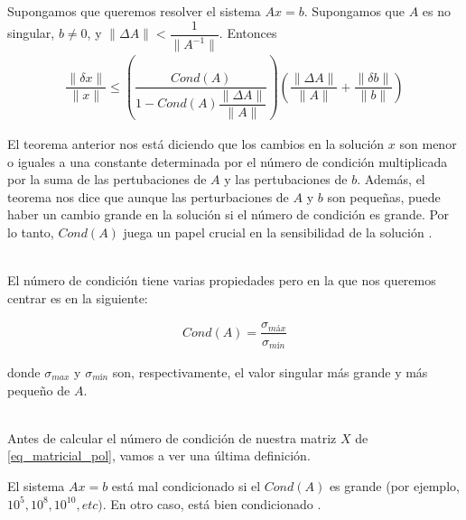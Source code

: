 \begin{theorem} \label{teo:perturbaciones}
Supongamos que queremos resolver el sistema $Ax = b$. Supongamos que $A$ es no singular, $b \neq 0$, y $\parallel \Delta A \parallel < \dfrac{1}{\parallel A^{-1} \parallel}$. Entonces
\begin{equation*}
    \begin{aligned}
    \dfrac{\parallel \delta x \parallel}{\parallel x \parallel} \leq (\dfrac{Cond(A)}{1 - Cond(A) \dfrac{\parallel \Delta A \parallel}{\parallel A \parallel}}) (\dfrac{\parallel \Delta A \parallel}{\parallel A \parallel} + \dfrac{\parallel \delta b \parallel}{\parallel b \parallel})
    \end{aligned}
\end{equation*} \cite{numerical_linear_algebra}
\end{theorem}

El teorema anterior nos está diciendo que los cambios en la solución $x$ son menor o iguales a una constante determinada por el número de condición multiplicada por la suma de las pertubaciones de $A$ y las pertubaciones de $b$. Además, el teorema nos dice que aunque las perturbaciones de $A$ y $b$ son pequeñas, puede haber un cambio grande en la solución si el número de condición es grande. Por lo tanto, $Cond(A)$ juega un papel crucial en la sensibilidad de la solución \cite{numerical_linear_algebra}. 

\\

El número de condición tiene varias propiedades pero en la que nos queremos centrar es en la siguiente: 

\begin{equation} \label{formula:num_cond}
    \begin{aligned}
    Cond(A) = \dfrac{\sigma_{máx}}{\sigma_{mín}}
    \end{aligned}
\end{equation}

donde $\sigma_{max}$ y $\sigma_{mín}$ son, respectivamente, el valor singular más grande y más pequeño de $A$. 

\\

Antes de calcular el número de condición de nuestra matriz $X$ de \ref{eq_matricial_pol}, vamos a ver una última definición. 

\begin{definition} \label{def:condicionamiento}
El sistema $Ax = b$ está mal condicionado si el $Cond(A)$ es grande (por ejemplo, $10^{5}, 10^{8}, 10^{10}, etc)$. En otro caso, está bien condicionado \cite{numerical_linear_algebra}.
\end{definition}

